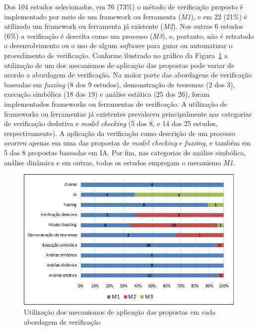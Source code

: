 Dos 104 estudos selecionados, em 76 (73\%) o método de verificação proposto é implementado por meio de um framework ou ferramenta (\textit{M1}), e em 22 (21\%) é utilizado um framework ou ferramenta já existente (\textit{M2}). Nos outros 6 estudos (6\%) a verificação é descrita como um processo (\textit{M3}), e, portanto, não é retratado o desenvolvimento ou o uso de algum \textit{software} para guiar ou automatizar o procedimento de verificação. Conforme ilustrado no gráfico da Figura~\ref{fig:rq4-aplicacao-propostas} a utilização de um dos mecanismos de aplicação das propostas pode variar de acordo a abordagem de verificação. Na maior parte das abordagens de verificação baseadas em \textit{fuzzing} (8 dos 9 estudos), demonstração de teoremas (2 dos 3), execução simbólica (18 dos 19) e análise estática (25 dos 26), foram implementados frameworks ou ferramentas de verificação. A utilização de frameworks ou ferramentas já existentes prevaleceu principalmente nas categorias de verificação dedutiva e \textit{model checking} (5 dos 8, e 14 dos 25 estudos, respectivamente). A aplicação da verificação como descrição de um processo ocorreu apenas em uma das propostas de \textit{model checking} e \textit{fuzzing}, e também em 5 das 8 propostas baseadas em IA. Por fim, nas categorias de análise simbólica, análise dinâmica e em outras, todos os estudos empregam o mecanismo \textit{M1}.   

\begin{figure}[!htb]
 \caption{Utilização dos mecanismos de aplicação das propostas em cada abordagem de verificação}
 \label{fig:rq4-aplicacao-propostas}
 \centering
 \includegraphics[scale=0.7]{figuras/rq4-aplicacao-propostas.png}
 \fdadospesquisa
\end{figure}

